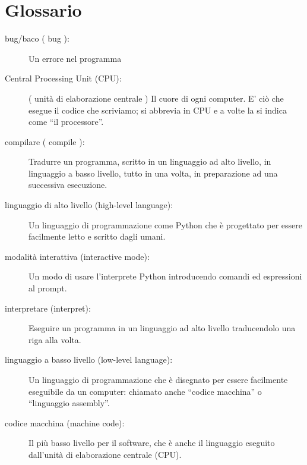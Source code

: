 \section{Glossario}

\begin{description}

\item[bug/baco ( bug ):]  Un errore nel programma

\item[Central Processing Unit (CPU):] ( unit\`{a} di elaborazione centrale ) Il cuore di ogni computer. E' ci\`{o} che esegue il codice che scriviamo; si abbrevia in CPU e a volte la si indica come {``}il processore''.

\item[compilare  ( compile ):]  Tradurre un programma, scritto in un linguaggio ad alto livello, in linguaggio a basso livello, tutto in una volta, in preparazione ad una successiva esecuzione.

\item[linguaggio di alto livello (high-level language):]  Un linguaggio di programmazione come Python che \`{e} progettato per essere facilmente letto e scritto dagli umani.

\item[modalit\`{a} interattiva (interactive mode):] Un modo di usare l'interprete Python introducendo comandi ed espressioni al prompt.

\item[interpretare (interpret):]  Eseguire un programma in un linguaggio ad alto livello traducendolo una riga alla volta.

\item[linguaggio a basso livello (low-level language):]  Un linguaggio di programmazione che \`{e} disegnato per essere facilmente eseguibile da un computer: chiamato anche {``}codice macchina'' o {``}linguaggio assembly''.

\item[codice macchina (machine code):]  Il pi\`{u} basso livello per il software, che \`{e} anche il linguaggio eseguito dall'unit\`{a} di elaborazione centrale (CPU).


\end{description}
